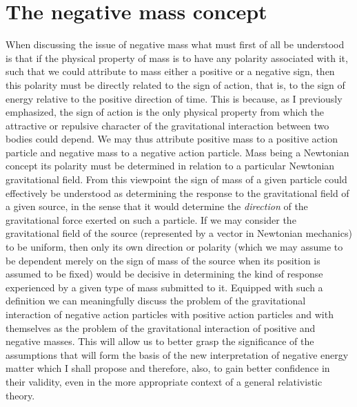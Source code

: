 \documentclass[notitlepage,12pt]{report}
\begin{document}
\section{The negative mass concept}

When discussing the issue of negative mass what must first of all be understood is that if the physical property of mass is to have any polarity associated with it, such that we could attribute to mass either a positive or a negative sign, then this polarity must be directly related to the sign of action, that is, to the sign of energy relative to the positive direction of time. This is because, as I previously emphasized, the sign of action is the only physical property from which the attractive or repulsive character of the gravitational interaction between two bodies could depend. We may thus attribute positive mass to a positive action particle and negative mass to a negative action particle. Mass being a Newtonian concept its polarity must be determined in relation to a particular Newtonian gravitational field. From this viewpoint the sign of mass of a given particle could effectively be understood as determining the response to the gravitational field of a given source, in the sense that it would determine the \textit{direction} of the gravitational force exerted on such a particle. If we may consider the gravitational field of the source (represented by a vector in Newtonian mechanics) to be uniform, then only its own direction or polarity (which we may assume to be dependent merely on the sign of mass of the source when its position is assumed to be fixed) would be decisive in determining the kind of response experienced by a given type of mass submitted to it. Equipped with such a definition we can meaningfully discuss the problem of the gravitational interaction of negative action particles with positive action particles and with themselves as the problem of the gravitational interaction of positive and negative masses. This will allow us to better grasp the significance of the assumptions that will form the basis of the new interpretation of negative energy matter which I shall propose and therefore, also, to gain better confidence in their validity, even in the more appropriate context of a general relativistic theory.
\end{document}
